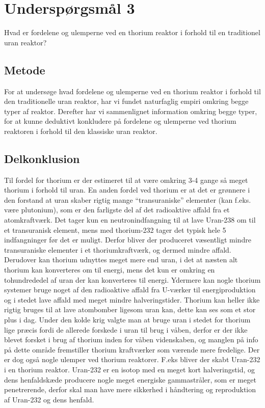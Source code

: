 \documentclass{article}
\begin{document}
\section{Underspørgsmål 3}

Hvad er fordelene og ulemperne ved en thorium reaktor i forhold til en traditionel uran reaktor?

\subsection{Metode}

For at undersøge hvad fordelene og ulemperne ved en thorium reaktor i forhold til den traditionelle uran reaktor, har vi fundet naturfaglig empiri omkring begge typer af reaktor. Derefter har vi sammenlignet information omkring begge typer, for at kunne deduktivt konkludere på fordelene og ulemperne ved thorium reaktoren i forhold til den klassiske uran reaktor.

\subsection{Delkonklusion}

Til fordel for thorium er der estimeret til at være omkring 3-4 gange så meget thorium i forhold til uran. En anden fordel ved thorium er at det er grønnere i den forstand at uran skaber rigtig mange “transuraniske” elementer (kan f.eks. være plutonium), som er den farligste del af det radioaktive affald fra et atomkraftværk. Det tager kun en neutronindfangning til at lave Uran-238 om til et transuranisk element, mens med thorium-232 tager det typisk hele 5 indfangninger før det er muligt. Derfor bliver der produceret væsentligt mindre transuraniske elementer i et thoriumkraftværk, og dermed mindre affald. Derudover kan thorium udnyttes meget mere end uran, i det at næsten alt thorium kan konverteres om til energi, mens det kun er omkring en tohundrededel af uran der kan konverteres til energi. Ydermere kan nogle thorium systemer bruge noget af den radioaktive affald fra U-værker til energiproduktion og i stedet lave affald med meget mindre halveringstider. Thorium kan heller ikke rigtig bruges til at lave atombomber ligesom uran kan, dette kan ses som et stor plus i dag. Under den kolde krig valgte man at bruge uran i stedet for thorium lige præcis fordi de allerede forskede i uran til brug i våben, derfor er der ikke blevet forsket i brug af thorium inden for våben videnskaben, og manglen på info på dette område fremstiller thorium kraftværker som værende mere fredelige.
Der er dog også nogle ulemper ved thorium reaktorer. F.eks bliver der skabt Uran-232 i en thorium reaktor. Uran-232 er en isotop med en meget kort halveringstid, og dens henfaldskæde producere nogle meget energiske gammastråler, som er meget penetrerende, derfor skal man have mere sikkerhed i håndtering og reproduktion af Uran-232 og dens henfald.
\end{document}
